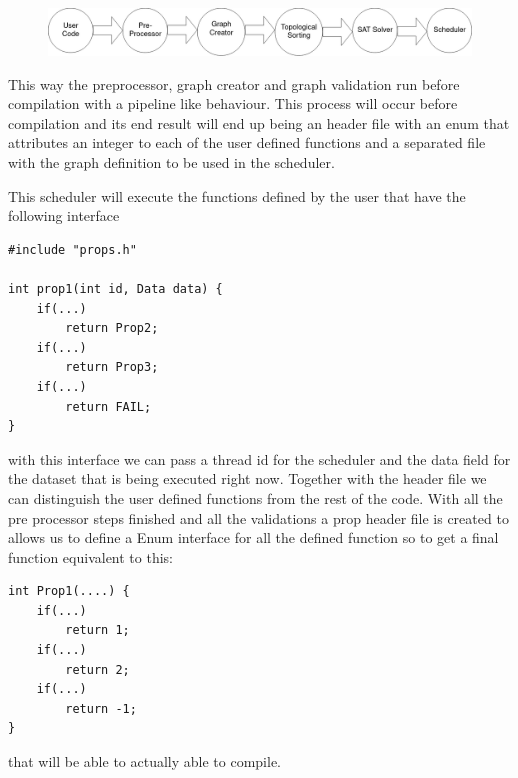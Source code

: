 \begin{figure}[h]
\includegraphics[width=15cm]{img/Tools-pipeline}
\end{figure}

This way the preprocessor, graph creator and graph validation run before compilation with a pipeline like behaviour.
This process will  occur before compilation and its end result will end up being an header file with an enum that attributes an integer to each of the user defined functions and a separated file with the graph definition to be used in the scheduler.




This scheduler will execute the functions defined by the user that have the following interface 
\begin{lstlisting}
#include "props.h"

int prop1(int id, Data data) { 
    if(...) 
        return Prop2; 
    if(...) 
        return Prop3; 
    if(...) 
        return FAIL; 
}
\end{lstlisting}
with this interface we can pass a thread id for the scheduler and the data field for the dataset that is being executed right now. Together with the header file we can distinguish the user defined functions from the rest of the code.
With all the pre processor steps finished and all the validations a prop header file is created to allows us to define a Enum interface for all the defined function so to get a final function equivalent to this:

\begin{lstlisting}
int Prop1(....) { 
    if(...) 
        return 1; 
    if(...) 
        return 2; 
    if(...) 
        return -1; 
} 
\end{lstlisting}{}
that will be able to actually able to compile.




